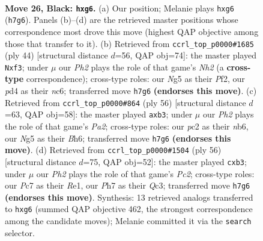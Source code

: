 \documentclass[11pt]{article}
\begin{document}
\clearpage

\begin{figure}[p]\centering
\begin{subfigure}{0.46\textwidth}\centering
\resizebox{\linewidth}{!}{%
\newchessgame
\chessboard[
  setfen={4r1k1/p1ppq2p/5pB1/6n1/1pPP4/P2Q4/2P2P1P/1R4K1 b - - 0 26},
  showmover=false,
  pgfstyle=straightmove, color=movearrow, markmove={h7-g6}
]}
\caption{}
\end{subfigure}\hfill
\begin{subfigure}{0.46\textwidth}\centering
\resizebox{\linewidth}{!}{%
\newchessgame
\chessboard[
  setfen={4r1k1/1p3pp1/1pnp1q1p/8/2P5/P4b1P/1P1Q1PPN/3R2K1 w - - 0 23},
  showmover=false,
  pgfstyle=straightmove, color=movearrow, markmove={h2-f3}
]}
\caption{}
\end{subfigure}
\\[4pt]
\begin{subfigure}{0.46\textwidth}\centering
\resizebox{\linewidth}{!}{%
\newchessgame
\chessboard[
  setfen={2r3k1/pp3q1p/1n4pB/4Pp2/8/1bP3Q1/P4P1P/3R1K2 w - - 0 29},
  showmover=false,
  pgfstyle=straightmove, color=movearrow, markmove={a2-b3}
]}
\caption{}
\end{subfigure}\hfill
\begin{subfigure}{0.46\textwidth}\centering
\resizebox{\linewidth}{!}{%
\newchessgame
\chessboard[
  setfen={r5k1/2p1q1p1/6r1/2p1p2p/2P1P3/1bQR3P/2P3P1/4R1K1 w - - 0 29},
  showmover=false,
  pgfstyle=straightmove, color=movearrow, markmove={c2-b3}
]}
\caption{}
\end{subfigure}
\caption{\textbf{Move 26, Black: \texttt{hxg6}.} (a) Our position; Melanie plays \texttt{hxg6} (\texttt{h7g6}). Panels (b)--(d) are the retrieved master positions whose correspondence most drove this move (highest QAP objective among those that transfer to it). (b) Retrieved from \texttt{ccrl\_top\_p0000\#1685} (ply 44) [structural distance $d$=56, QAP obj=74]: the master played \texttt{Nxf3}; under $\mu$ our \emph{Ph2} plays the role of that game's \emph{Nh2} (a \textbf{cross-type} correspondence); cross-type roles: our \emph{N}g5 as their \emph{P}f2, our \emph{p}d4 as their \emph{n}c6; transferred move \texttt{h7g6} \textbf{(endorses this move)}. (c) Retrieved from \texttt{ccrl\_top\_p0000\#864} (ply 56) [structural distance $d$=63, QAP obj=58]: the master played \texttt{axb3}; under $\mu$ our \emph{Ph2} plays the role of that game's \emph{Pa2}; cross-type roles: our \emph{p}c2 as their \emph{n}b6, our \emph{N}g5 as their \emph{B}h6; transferred move \texttt{h7g6} \textbf{(endorses this move)}. (d) Retrieved from \texttt{ccrl\_top\_p0000\#1504} (ply 56) [structural distance $d$=75, QAP obj=52]: the master played \texttt{cxb3}; under $\mu$ our \emph{Ph2} plays the role of that game's \emph{Pc2}; cross-type roles: our \emph{P}c7 as their \emph{R}e1, our \emph{P}h7 as their \emph{Q}c3; transferred move \texttt{h7g6} \textbf{(endorses this move)}. Synthesis: 13 retrieved analogs transferred to \texttt{hxg6} (summed QAP objective 462, the strongest correspondence among the candidate moves); Melanie committed it via the \texttt{search} selector.}
\label{fig:thought-m51}
\end{figure}
\end{document}
